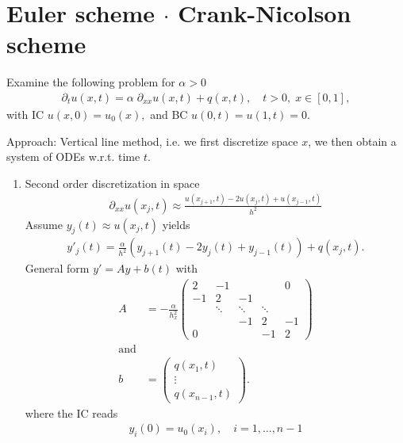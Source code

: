 \documentclass[12pt]{article}
\begin{document}
\section{Euler scheme $\cdot$ Crank-Nicolson scheme}
\begin{example}
	Examine the following problem for $\alpha>0$
	\begin{align}
		\label{eq:diffusion}
		\partial_t u(x,t) = \alpha \;\partial_{xx} u(x,t)+q(x,t), \quad t>0, \; x\in[0,1],
	\end{align}
	with IC $u(x,0) = u_0(x),$ and BC $u(0,t) = u(1,t) = 0.$
\end{example}
Approach: Vertical line method, i.e. we first discretize space $x$, 
we then obtain a system of ODEs w.r.t. time $t$.
\begin{enumerate}
	\item Second order discretization in space
	      \begin{align*}
		      \partial_{xx} u(x_j,t)
		      \approx \frac{u(x_{j+1},t) - 2u(x_j,t) + u(x_{j-1},t)}{h^2}
	      \end{align*}
	      Assume $y_j(t) \approx u(x_j,t)$ yields
	      \begin{align*}
		      y'_j(t) =
		      \frac{\alpha}{h^2}
		      (y_{j+1}(t) - 2y_j(t) + y_{j-1}(t)) + q(x_{j},t).
	      \end{align*}
	      General form $y' = Ay + b(t)$ with
	      \begin{align*}
		      A & = -\frac{\alpha}{h_x^2}
		      \begin{pmatrix}
			      2  & -1     &        &        & 0  \\
			      -1 & 2      & -1     &        &    \\
			         & \ddots & \ddots & \ddots &    \\
			         &        & -1     & 2      & -1 \\
			      0  &        &        & -1     & 2
		      \end{pmatrix}  \\
		      \text{and}                  \\
		      b & =
		      \begin{pmatrix}
			      q(x_1,t) \\
			      \vdots   \\
			      q(x_{n-1},t)
		      \end{pmatrix}.
	      \end{align*}
	      where the IC reads
	      \begin{align*}
		      y_i(0)= u_0(x_i),\quad i=1,\ldots,n-1
	      \end{align*}
	      

\end{enumerate}
\end{document}
